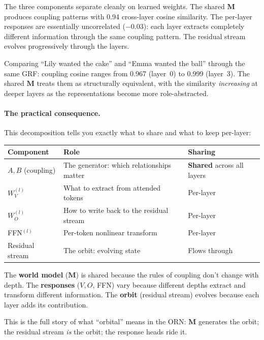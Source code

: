 \documentclass[11pt, a4paper]{article}
\newcommand{\M}{\mathbf{M}}
\theoremstyle{remark}
\begin{document}
\begin{enumerate}[nosep]
    The three components separate cleanly on learned weights.
    The shared $\M$ produces coupling patterns with 0.94 cross-layer cosine similarity.
    The per-layer responses are essentially uncorrelated ($-0.03$): each layer extracts completely different information through the same coupling pattern.
    The residual stream evolves progressively through the layers.

    Comparing ``Lily wanted the cake'' and ``Emma wanted the ball'' through the same GRF: coupling cosine ranges from 0.967 (layer~0) to 0.999 (layer~3).
    The shared $\M$ treats them as structurally equivalent, with the similarity \emph{increasing} at deeper layers as the representations become more role-abstracted.
\end{enumerate}

\paragraph{The practical consequence.}
This decomposition tells you exactly what to share and what to keep per-layer:
\begin{center}\small
\renewcommand{\arraystretch}{1.3}
\begin{tabular}{@{}lll@{}}
\toprule
\textbf{Component} & \textbf{Role} & \textbf{Sharing} \\
\midrule
$A, B$ (coupling) & The generator: which relationships matter & \textbf{Shared} across all layers \\
$W_V^{(l)}$ & What to extract from attended tokens & Per-layer \\
$W_O^{(l)}$ & How to write back to the residual stream & Per-layer \\
FFN$^{(l)}$ & Per-token nonlinear transform & Per-layer \\
Residual stream & The orbit: evolving state & Flows through \\
\bottomrule
\end{tabular}
\end{center}

\noindent
The \textbf{world model} ($\M$) is shared because the rules of coupling don't change with depth.
The \textbf{responses} ($V, O$, FFN) vary because different depths extract and transform different information.
The \textbf{orbit} (residual stream) evolves because each layer adds its contribution.

This is the full story of what ``orbital'' means in the ORN:
$\M$ generates the orbit; the residual stream \emph{is} the orbit; the response heads ride it.
\end{document}
